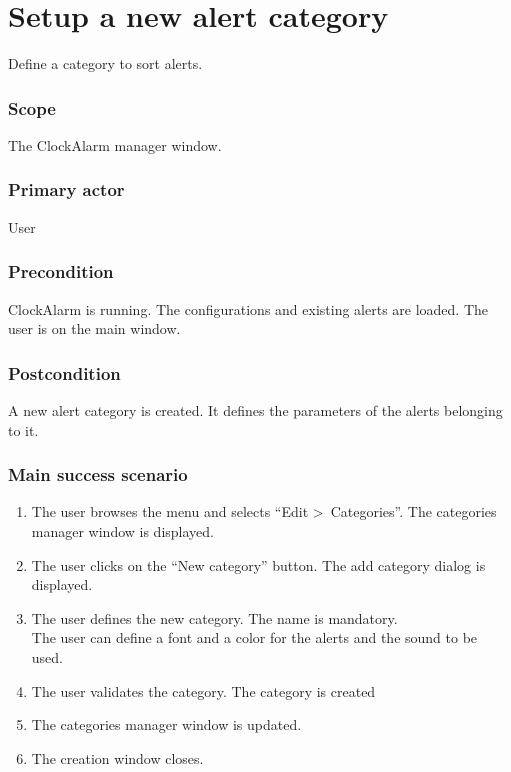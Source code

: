\section{Setup a new alert category}\label{subsec:usecase_add_category}
Define a category to sort alerts.
\subsubsection{Scope}
The ClockAlarm manager window.
\subsubsection{Primary actor}
User
\subsubsection{Precondition}
ClockAlarm is running. The configurations and existing alerts are loaded. The user is on the main window.
\subsubsection{Postcondition}
A new alert category is created. It defines the parameters of the alerts belonging to it.
\subsubsection{Main success scenario}
\begin{enumerate}
	\item The user browses the menu and selects ``Edit \textgreater~Categories''. The categories manager window is displayed.
	\item The user clicks on the ``New category'' button. The add category dialog is displayed.
	\item\label{itm:ucca_enter_sc}The user defines the new category. The name is mandatory. \\The user can define a font and a color for the alerts and the sound to be used.
	\item\label{itm:ucca_validate_sc} The user validates the category. The category is created
	\item The categories manager window is updated.
	\item The creation window closes.
\end{enumerate}
